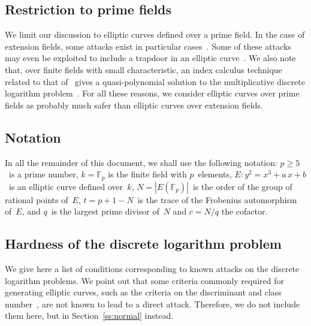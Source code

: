 \documentclass[twocolumn,letterpaper,10pt]{article}
\def\F{\mathbb{F}}
\def\abs#1{\left|#1\right|}
\def\XXX{{\colorbox{red}{{\color{white}\bfseries XXX}}}}
\begin{document}
\subsection*{Restriction to prime fields}
We limit our discussion to elliptic curves defined over a prime field.
In the case of extension fields,
some attacks exist in particular
cases~\cite{jc2013jv,rsa2004mtw,asia1999dgm,jc2002ghs}.
Some of these attacks may even be exploited
to include a trapdoor in an elliptic curve~\cite{jc2006teske}.
We also note that, over finite fields with small characteristic,
an index calculus technique related to that of~\cite{jc2013jv}
gives a quasi-polynomial solution to
the multiplicative discrete logarithm problem~\cite{euro2014bgjt}.
For all these reasons, we consider elliptic curves over prime fields
as probably much safer than elliptic curves over extension fields.



\subsection*{Notation}
In all the remainder of this document,
we shall use the following notation:
$p ≥ 5$~is a prime number,
$k = \F_{p}$ is the finite field with $p$~elements,
$E: y^2 = x^3 + a\,x + b$~is an elliptic curve defined over~$k$,
$N = \abs{E(\F_p)}$~is the order of the group of rational points of~$E$,
$t = p + 1 - N$~is the trace of the Frobenius automorphism of~$E$,
and $q$~is the largest prime divisor of~$N$ and $c = N/q$ the cofactor.

\subsection{Hardness of the discrete logarithm problem}
\label{ss:dlp}

We give here a list of conditions corresponding to
known attacks on the discrete logarithm problems.
We point out that some criteria commonly required
for generating elliptic curves,
such as the criteria on the discriminant and class number~\cite{rfc5639},
are not known to lead to a direct attack.
Therefore, we do not include them here,
but in Section~\ref{ss:normal} instead.
\end{document}
